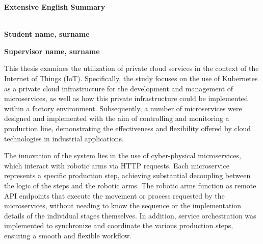 \clearpage
{}
\begin{center}
  {\LARGE \textbf{Extensive English Summary}}\\[1cm]
  \textbf{\engdoctitle}\\[1cm]
  \begin{minipage}{0.38\textwidth}
    \begin{flushleft}
      \textbf{Student name, surname}\\
      \textbf{\nommesmallenglish}
    \end{flushleft}
  \end{minipage}
  \begin{minipage}{0.38\textwidth}
    \begin{flushright}
      \textbf{Supervisor name, surname}\\
      \textbf{\supnameegnlish}
    \end{flushright}
  \end{minipage}
\end{center}
\vspace{10mm}

This thesis examines the utilization of private cloud services in the context of the Internet of Things (IoT). 
Specifically, the study focuses on the use of Kubernetes as a private cloud infrastructure for the development 
and management of microservices, as well as how this private infrastructure could be implemented within 
a factory environment. Subsequently, a number of microservices were designed and implemented with the aim of controlling 
and monitoring a production line, demonstrating the effectiveness and flexibility offered by cloud technologies in 
industrial applications.

The innovation of the system lies in the use of cyber-physical microservices, which interact with robotic arms
 via HTTP requests. Each microservice represents a specific production step, achieving substantial decoupling 
 between the logic of the steps and the robotic arms. The robotic arms function as remote API endpoints that execute the 
 movement or process requested by the microservices, without needing to know the sequence or the implementation details 
 of the individual stages themselves. In addition, service orchestration was implemented to 
 synchronize and coordinate the various production steps, ensuring a smooth and flexible workflow.

